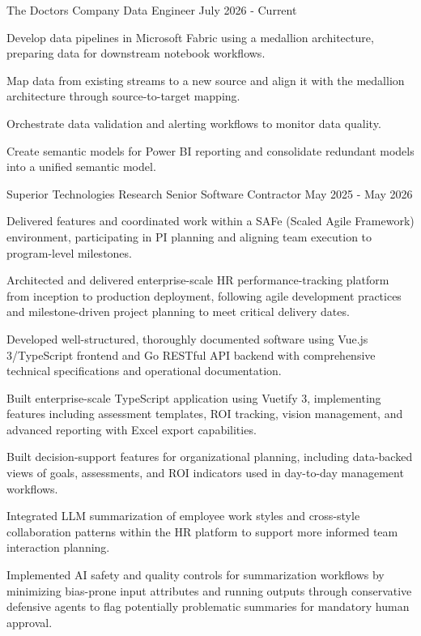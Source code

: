 \documentclass{../styles/cv}
\begin{document}
\subsectionpositiondate
    {The Doctors Company}
    {Data Engineer}
    {July 2026 - Current}
\resumesublistbegin
    \item Develop data pipelines in Microsoft Fabric using a medallion architecture, preparing data for downstream notebook workflows.
    \item Map data from existing streams to a new source and align it with the medallion architecture through source-to-target mapping.
    \item Orchestrate data validation and alerting workflows to monitor data quality.
    \item Create semantic models for Power BI reporting and consolidate redundant models into a unified semantic model.
\resumesublistend

\subsectionpositiondate
    {Superior Technologies Research}
    {Senior Software Contractor}
    {May 2025 - May 2026}
\resumesublistbegin
    \resumenestedlistbegin
    \item Delivered features and coordinated work within a SAFe (Scaled Agile Framework) environment, participating in PI planning and aligning team execution to program-level milestones.
    \item Architected and delivered enterprise-scale HR performance-tracking platform from inception to production deployment, following agile development practices and milestone-driven project planning to meet critical delivery dates.
    \item Developed well-structured, thoroughly documented software using Vue.js 3/TypeScript frontend and Go RESTful API backend with comprehensive technical specifications and operational documentation.
    \item Built enterprise-scale TypeScript application using Vuetify 3, implementing features including assessment templates, ROI tracking, vision management, and advanced reporting with Excel export capabilities.
    \item Built decision-support features for organizational planning, including data-backed views of goals, assessments, and ROI indicators used in day-to-day management workflows.
    \item Integrated LLM summarization of employee work styles and cross-style collaboration patterns within the HR platform to support more informed team interaction planning.
    \item Implemented AI safety and quality controls for summarization workflows by minimizing bias-prone input attributes and running outputs through conservative defensive agents to flag potentially problematic summaries for mandatory human approval.
\end{document}
